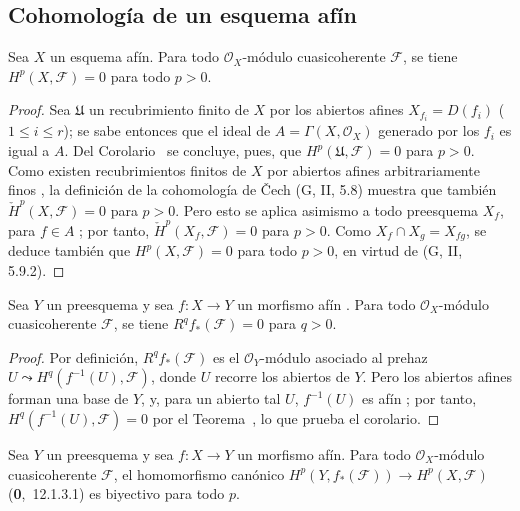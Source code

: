 \subsection{Cohomología de un esquema afín}
\label{subsection:III.1.3}
\label{subsection:III.1.3-fr}

\begin{theorem}[1.3.1]
\label{III.1.3.1}
\label{III.1.3.1-fr}
Sea $X$ un esquema afín.
Para todo $\mathcal O_X$-módulo cuasicoherente $\mathcal F$, se tiene $H^p(X,\mathcal F)=0$ para todo $p>0$.
\end{theorem}

\begin{proof}
Sea $\mathfrak U$ un recubrimiento finito de $X$ por los abiertos afines $X_{f_i}=D(f_i)$ ($1\leq i\leq r$); se sabe entonces que el ideal de $A=\Gamma(X,\mathcal O_X)$ generado por los $f_i$ es igual a $A$.
Del Corolario~ se concluye, pues, que $H^p(\mathfrak U,\mathcal F)=0$ para $p>0$.
Como existen recubrimientos finitos de $X$ por abiertos afines arbitrariamente finos , la definición de la cohomología de \v Cech (G, II, 5.8) muestra que también $\check H^p(X,\mathcal F)=0$ para $p>0$.
Pero esto se aplica asimismo a todo preesquema $X_f$, para $f\in A$ ; por tanto, $\check H^p(X_f,\mathcal F)=0$ para $p>0$.
Como $X_f\cap X_g=X_{fg}$, se deduce también que $H^p(X,\mathcal F)=0$ para todo $p>0$, en virtud de (G, II, 5.9.2).
\end{proof}

\begin{corollary}[1.3.2]
\label{III.1.3.2}
\label{III.1.3.2-fr}
Sea $Y$ un preesquema y sea $f:X\to Y$ un morfismo afín \textup{}.
Para todo $\mathcal O_X$-módulo cuasicoherente $\mathcal F$, se tiene $R^qf_*(\mathcal F)=0$ para $q>0$.
\end{corollary}

\begin{proof}
Por definición, $R^qf_*(\mathcal F)$ es el $\mathcal O_Y$-módulo asociado al prehaz $U\leadsto H^q(f^{-1}(U),\mathcal F)$, donde $U$ recorre los abiertos de $Y$.
Pero los abiertos afines forman una base de $Y$, y, para un abierto tal $U$, $f^{-1}(U)$ es afín ; por tanto, $H^q(f^{-1}(U),\mathcal F)=0$ por el Teorema~, lo que prueba el corolario.
\end{proof}

\begin{corollary}[1.3.3]
\label{III.1.3.3}
\label{III.1.3.3-fr}
Sea $Y$ un preesquema y sea $f:X\to Y$ un morfismo afín.
Para todo $\mathcal O_X$-módulo cuasicoherente $\mathcal F$, el homomorfismo canónico $H^p(Y,f_*(\mathcal F))\to H^p(X,\mathcal F)$ \textup{(\textbf{0},~12.1.3.1)} es biyectivo para todo $p$.
\end{corollary}

